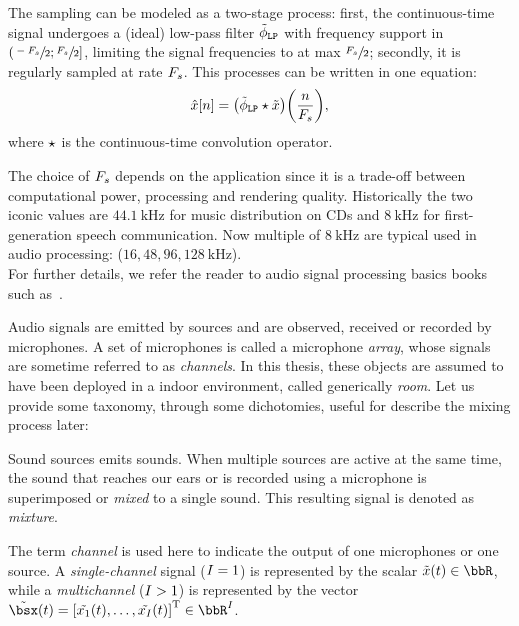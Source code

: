 The sampling can be modeled as a two-stage process:
first, the continuous-time signal undergoes a (ideal) low-pass filter $\lowpassfilter$ with frequency support in $\kintervoc{\sfrac{-\Fs}{2}}{\sfrac{\Fs}{2}}$, limiting the signal frequencies to at max $\sfrac{F_s}{2}$;
secondly, it is regularly sampled at rate $F_s$.
This processes can be written in one equation:
\begin{equation}
    \discTime[n]{\mic} = \kparen{\lowpassfilter\convCont\contTime{\mic}} \kparen{\frac{n}{\Fs}}
    ,
\end{equation}
where $\star$ is the continuous-time convolution operator.

The choice of $F_s$ depends on the application since it is a trade-off between computational power, processing and rendering quality.
Historically the two iconic values are $\SI{44.1}{\kHz}$ for music distribution on CDs and $\SI{8}{\kHz}$ for first-generation speech communication.
Now multiple of $\SI{8}{\kHz}$ are typical used in audio processing: ($16, 48, 96, \SI{128}{\kHz}$).
\\For further details, we refer the reader to audio signal processing basics books such as~.

\mynewline
Audio signals are emitted by sources and are observed, received or recorded by microphones.
A set of microphones is called a microphone \textit{array}, whose signals are sometime referred to as \textit{channels}.
In this thesis, these objects are assumed to have been deployed in a indoor environment, called generically \textit{room}.
Let us provide some taxonomy, through some dichotomies, useful for describe the mixing process later:

Sound sources emits sounds.
When multiple sources are active at the same time, the sound that reaches our ears or is recorded using a microphone is superimposed or \textit{mixed} to a single sound.
This resulting signal is denoted as \textit{mixture}.

The term \textit{channel} is used here to indicate the output of one microphones or one source.
A \textit{single-channel} signal ($I = 1$) is represented by the scalar $\contTime[t]{\mic} \in \R$,
while a \textit{multichannel} ($I >   1$) is represented by the vector $\contTime[t]{\mics} = \ktranspose{\klist{\contTime[t]{\mic_1}, \dots, \contTime[t]{\mic_{\numMics}}}} \in \R^{\numMics}$.

